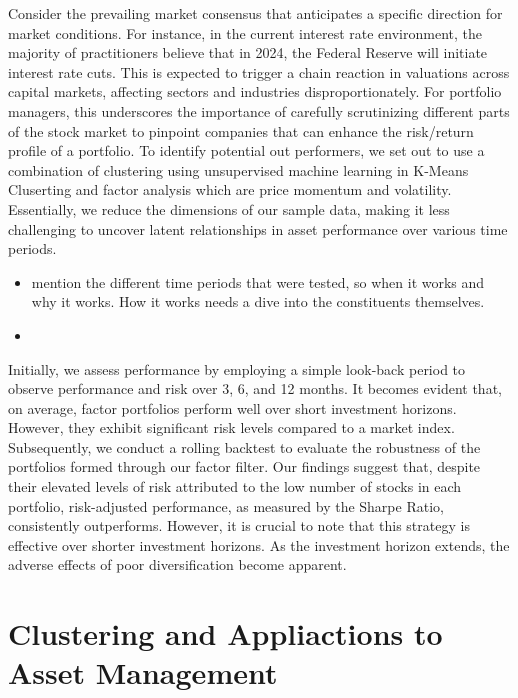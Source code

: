 \documentclass[11pt,preprint, authoryear]{elsarticle}
\numberwithin{equation}{section}
\numberwithin{figure}{section}
\numberwithin{table}{section}
\begin{document}
Consider the prevailing market consensus that anticipates a specific
direction for market conditions. For instance, in the current interest
rate environment, the majority of practitioners believe that in 2024,
the Federal Reserve will initiate interest rate cuts. This is expected
to trigger a chain reaction in valuations across capital markets,
affecting sectors and industries disproportionately. For portfolio
managers, this underscores the importance of carefully scrutinizing
different parts of the stock market to pinpoint companies that can
enhance the risk/return profile of a portfolio. To identify potential
out performers, we set out to use a combination of clustering using
unsupervised machine learning in K-Means Cluserting and factor analysis
which are price momentum and volatility. Essentially, we reduce the
dimensions of our sample data, making it less challenging to uncover
latent relationships in asset performance over various time periods.

\begin{itemize}
\item
  mention the different time periods that were tested, so when it works
  and why it works. How it works needs a dive into the constituents
  themselves.
\item
\end{itemize}

Initially, we assess performance by employing a simple look-back period
to observe performance and risk over 3, 6, and 12 months. It becomes
evident that, on average, factor portfolios perform well over short
investment horizons. However, they exhibit significant risk levels
compared to a market index. Subsequently, we conduct a rolling backtest
to evaluate the robustness of the portfolios formed through our factor
filter. Our findings suggest that, despite their elevated levels of risk
attributed to the low number of stocks in each portfolio, risk-adjusted
performance, as measured by the Sharpe Ratio, consistently outperforms.
However, it is crucial to note that this strategy is effective over
shorter investment horizons. As the investment horizon extends, the
adverse effects of poor diversification become apparent.

\hypertarget{clustering-and-appliactions-to-asset-management}{%
\section{Clustering and Appliactions to Asset
Management}\label{clustering-and-appliactions-to-asset-management}}
\end{document}
